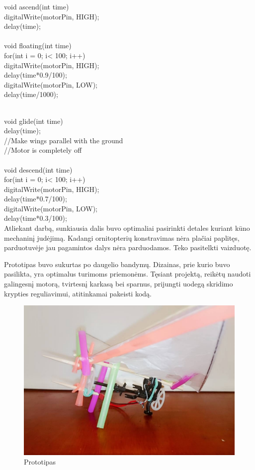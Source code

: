 \documentclass{VUMIFPSkursinis}
\begin{document}
void ascend(int time){\\
	digitalWrite(motorPin, HIGH);\\
	delay(time);\\
}\\

void floating(int time){\\
	for(int i = 0; i< 100; i++){\\
		digitalWrite(motorPin, HIGH);\\
		delay(time*0.9/100);\\
		digitalWrite(motorPin, LOW);\\
		delay(time/1000);\\
	}\\
}

void glide(int time){\\
	delay(time);\\
	//Make wings parallel with the ground\\
	//Motor is completely off\\
}\\

void descend(int time){\\
	for(int i = 0; i< 100; i++){\\
		digitalWrite(motorPin, HIGH);\\
		delay(time*0.7/100);\\
		digitalWrite(motorPin, LOW);\\
		delay(time*0.3/100);\\
	}
}
Atliekant darbą, sunkiausia dalis buvo optimaliai pasirinkti detales kuriant kūno mechaninį judėjimą. Kadangi ornitopterių konstravimas nėra plačiai paplitęs, parduotuvėje jau pagamintos dalys nėra parduodamos. Teko pasitelkti vaizduotę. \par
Prototipas buvo sukurtas po daugelio bandymų. Dizainas, prie kurio buvo pasilikta, yra optimalus turimoms priemonėms. Tęsiant projektą, reikėtų naudoti galingesnį motorą, tvirtesnį karkasą bei sparnus, prijungti uodegą skridimo krypties reguliavimui, atitinkamai pakeisti kodą.

\begin{figure}[H]
    \centering
    \includegraphics[scale=0.5]{img/orni}
    \caption{Prototipas}
    \label{img:mlp}
\end{figure}
\end{document}
